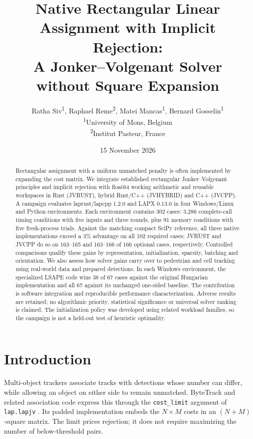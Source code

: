\documentclass[11pt,a4paper]{article}
\title{Native Rectangular Linear Assignment with Implicit Rejection:\\
A Jonker--Volgenant Solver without Square Expansion}
\author{Ratha Siv\textsuperscript{1}, Raphael Reme\textsuperscript{2}, Matei Mancas\textsuperscript{1}, Bernard Gosselin\textsuperscript{1}\\[3pt]{\normalsize \textsuperscript{1}University of Mons, Belgium}\\{\normalsize \textsuperscript{2}Institut Pasteur, France}}
\date{15 November 2026}
\begin{document}
\maketitle

\begin{abstract}
Rectangular assignment with a uniform unmatched penalty is often implemented by expanding the cost matrix. We integrate established rectangular Jonker--Volgenant principles and implicit rejection with float64 working arithmetic and reusable workspaces in Rust (JVRUST), hybrid Rust/C++ (JVHYBRID) and C++ (JVCPP). A campaign evaluates laprust/lapcpp 1.2.0 and LAPX 0.13.0 in four Windows/Linux and Python environments. Each environment contains 302 cases: 3,286 complete-call timing conditions with five inputs and three rounds, plus 91 memory conditions with five fresh-process trials. Against the matching compact SciPy reference, all three native implementations exceed a 3\% advantage on all 102 required cases; JVRUST and JVCPP do so on 163--165 and 163--166 of 166 optional cases, respectively. Controlled comparisons qualify these gains by representation, initialization, sparsity, batching and orientation. We also assess how solver gains carry over to pedestrian and cell tracking using real-world data and prepared detections. In each Windows environment, the specialized LSAPE code wins 38 of 67 cases against the original Hungarian implementation and all 67 against its unchanged one-sided baseline. The contribution is software integration and reproducible performance characterization. Adverse results are retained; no algorithmic priority, statistical significance or universal solver ranking is claimed. The initialization policy was developed using related workload families, so the campaign is not a held-out test of heuristic optimality.
\end{abstract}

\FloatBarrier
\section{Introduction}

Multi-object trackers associate tracks with detections whose number can differ, while allowing an object on either side to remain unmatched. ByteTrack \cite{zhang2022bytetrack} and related association code express this through the \texttt{cost\_limit} argument of \texttt{lap.lapjv} \cite{gatagatlap}. Its padded implementation embeds the $N\times M$ costs in an $(N+M)$-square matrix. The limit prices rejection; it does not require maximizing the number of below-threshold pairs.
\end{document}
